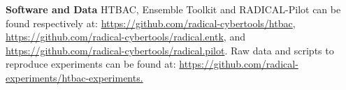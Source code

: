 \footnotesize \textbf{Software and Data} HTBAC, Ensemble Toolkit and
RADICAL-Pilot can be found respectively at:
\url{https://github.com/radical-cybertools/htbac},
\url{https://github.com/radical-cybertools/radical.entk}, and
\url{https://github.com/radical-cybertools/radical.pilot}. Raw data and
scripts to reproduce experiments can be found at:
\url{https://github.com/radical-experiments/htbac-experiments.}

